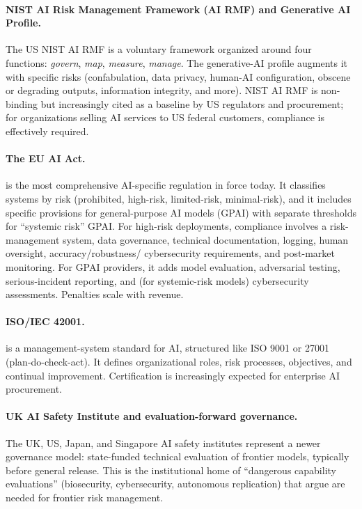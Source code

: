 \paragraph{NIST AI Risk Management Framework (AI RMF) and
Generative AI Profile.} The US NIST AI RMF
\citep{nist2023airmf} is a voluntary framework organized around
four functions: \textit{govern}, \textit{map}, \textit{measure},
\textit{manage}. The generative-AI profile
\citep{nist2024genai_profile} augments it with specific risks
(confabulation, data privacy, human-AI configuration, obscene or
degrading outputs, information integrity, and more). NIST AI RMF
is non-binding but increasingly cited as a baseline by US
regulators and procurement; for organizations selling AI
services to US federal customers, compliance is effectively
required.

\paragraph{The EU AI Act.} \citet{eu_aiact_2024} is the most
comprehensive AI-specific regulation in force today. It
classifies systems by risk (prohibited, high-risk, limited-risk,
minimal-risk), and it includes specific provisions for
general-purpose AI models (GPAI) with separate thresholds for
``systemic risk'' GPAI. For high-risk deployments, compliance
involves a risk-management system, data governance, technical
documentation, logging, human oversight, accuracy/robustness/
cybersecurity requirements, and post-market monitoring. For
GPAI providers, it adds model evaluation, adversarial testing,
serious-incident reporting, and (for systemic-risk models)
cybersecurity assessments. Penalties scale with revenue.

\paragraph{ISO/IEC 42001.} \citep{iso42001_2023} is a
management-system standard for AI, structured like ISO 9001 or
27001 (plan-do-check-act). It defines organizational roles, risk
processes, objectives, and continual improvement. Certification
is increasingly expected for enterprise AI procurement.

\paragraph{UK AI Safety Institute and evaluation-forward
governance.} The UK, US, Japan, and Singapore AI safety
institutes \citep{uk_aisi_2024, singapore_aiverify_2024}
represent a newer governance model: state-funded technical
evaluation of frontier models, typically before general release.
This is the institutional home of ``dangerous capability
evaluations'' (biosecurity, cybersecurity, autonomous replication)
that \citet{shevlane2023model} argue are needed for frontier
risk management.

